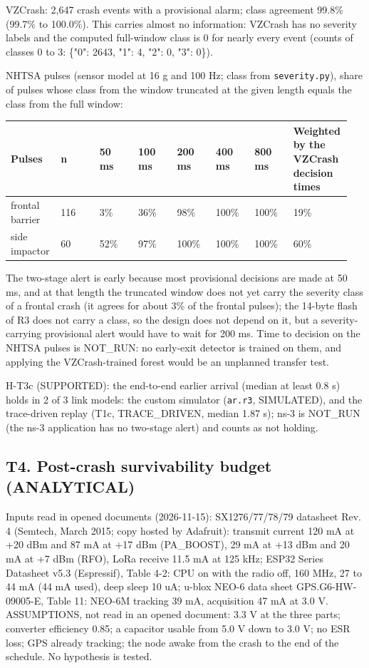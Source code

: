 VZCrash: 2,647 crash events with a provisional alarm; class agreement 99.8\% (99.7\% to 100.0\%). This carries almost no information: VZCrash has no severity labels and the computed full-window class is 0 for nearly every event (counts of classes 0 to 3: \{"0": 2643, "1": 4, "2": 0, "3": 0\}).

NHTSA pulses (sensor model at 16 g and 100 Hz; class from \texttt{severity.py}), share of pulses whose class from the window truncated at the given length equals the class from the full window:

{\scriptsize\raggedright
\begin{longtable}{p{0.119\linewidth}p{0.119\linewidth}p{0.119\linewidth}p{0.119\linewidth}p{0.119\linewidth}p{0.119\linewidth}p{0.119\linewidth}p{0.119\linewidth}}
\toprule
Pulses & n & 50 ms & 100 ms & 200 ms & 400 ms & 800 ms & Weighted by the VZCrash decision times \\
\midrule
\endhead
frontal barrier & 116 & 3\% & 36\% & 98\% & 100\% & 100\% & 19\% \\
side impactor & 60 & 52\% & 97\% & 100\% & 100\% & 100\% & 60\% \\
\bottomrule
\end{longtable}}

The two-stage alert is early because most provisional decisions are made at 50 ms, and at that length the truncated window does not yet carry the severity class of a frontal crash (it agrees for about 3\% of the frontal pulses); the 14-byte flash of R3 does not carry a class, so the design does not depend on it, but a severity-carrying provisional alert would have to wait for 200 ms. Time to decision on the NHTSA pulses is NOT\_RUN: no early-exit detector is trained on them, and applying the VZCrash-trained forest would be an unplanned transfer test.

H-T3c (SUPPORTED): the end-to-end earlier arrival (median at least 0.8 s) holds in 2 of 3 link models: the custom simulator (\texttt{ar.r3}, SIMULATED), and the trace-driven replay (T1c, TRACE\_DRIVEN, median 1.87 s); ns-3 is NOT\_RUN (the ns-3 application has no two-stage alert) and counts as not holding.

\subsection*{T4. Post-crash survivability budget (ANALYTICAL)}

Inputs read in opened documents (2026-11-15): SX1276/77/78/79 datasheet Rev. 4 (Semtech, March 2015; copy hosted by Adafruit): transmit current 120 mA at +20 dBm and 87 mA at +17 dBm (PA\_BOOST), 29 mA at +13 dBm and 20 mA at +7 dBm (RFO), LoRa receive 11.5 mA at 125 kHz; ESP32 Series Datasheet v5.3 (Espressif), Table 4-2: CPU on with the radio off, 160 MHz, 27 to 44 mA (44 mA used), deep sleep 10 uA; u-blox NEO-6 data sheet GPS.G6-HW-09005-E, Table 11: NEO-6M tracking 39 mA, acquisition 47 mA at 3.0 V. ASSUMPTIONS, not read in an opened document: 3.3 V at the three parts; converter efficiency 0.85; a capacitor usable from 5.0 V down to 3.0 V; no ESR loss; GPS already tracking; the node awake from the crash to the end of the schedule. No hypothesis is tested.

